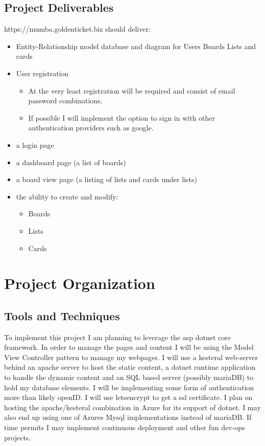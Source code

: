 \documentclass[letterpaper]{article}
\begin{document}
\subsection{Project Deliverables}
https://mumba.goldenticket.biz should deliver:
\begin{itemize}
  \item Entity-Relationship model database and diagram for Users Boards Lists and cards
  \item User registration
    \begin{itemize}
      \item At the very least registration will be required and consist of email password combinations.
      \item If possible I will implement the option to sign in with other authentication providers such as google.
    \end{itemize}
  \item a login page
  \item a dashboard page (a list of boards)
  \item a board view page (a listing of lists and cards under lists)
  \item the ability to create and modify:
    \begin{itemize}
      \item Boards
      \item Lists
      \item Cards
    \end{itemize}
\end{itemize}

\pagebreak
\section{Project Organization}


\subsection{Tools and Techniques}
To implement this project I am planning to leverage the asp dotnet core framework. In order to manage the pages and content I will be using the Model View Controller pattern to manage my webpages. I will use a kesteral web-server behind an apache server to host the static content, a dotnet runtime application to handle the dynamic content and an SQL based server (possibly mariaDB) to hold my database elements. I will be implementing some form of authentication more than likely openID. I will use letsencrypt to get a ssl certificate. I plan on hosting the apache/kesteral combination in Azure for its support of dotnet. I may also end up using one of Azures Mysql implementations instead of mariaDB. If time permits I may implement continuous deployment and other fun dev-ops projects.
\end{document}
